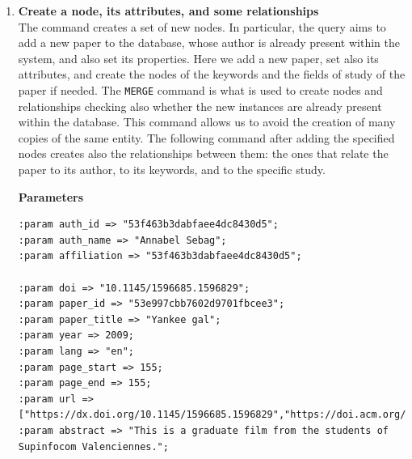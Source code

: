 \begin{enumerate}
    \item \textbf{Create a node, its attributes, and some relationships} \\
    The command creates a set of new nodes.
    In particular, the query aims to add a new paper to the database, whose author is already present within the system, and also set its properties.
    Here we add a new paper, set also its attributes, and create the nodes of the keywords and the fields of study of the paper if needed.
    The \verb|MERGE| command is what is used to create nodes and relationships checking also whether the new instances are already present within the database.
    This command allows us to avoid the creation of many copies of the same entity.
    The following command after adding the specified nodes creates also the relationships between them: the ones that relate the paper to its author, to its keywords, and to the specific study.

    \textbf{Parameters}
    \begin{lstlisting}[label={lst:parameters_command1neo4j}]
:param auth_id => "53f463b3dabfaee4dc8430d5";
:param auth_name => "Annabel Sebag";
:param affiliation => "53f463b3dabfaee4dc8430d5";

:param doi => "10.1145/1596685.1596829";
:param paper_id => "53e997cbb7602d9701fbcee3";
:param paper_title => "Yankee gal";
:param year => 2009;
:param lang => "en";
:param page_start => 155;
:param page_end => 155;
:param url => ["https://dx.doi.org/10.1145/1596685.1596829","https://doi.acm.org/10.1145/1596685.1596829","db/conf/siggraph/siggraph2009festival.html#Sebag09c","https://doi.org/10.1145/1596685.1596829"];
:param abstract => "This is a graduate film from the students of Supinfocom Valenciennes.";


\end{lstlisting}
\end{enumerate}
